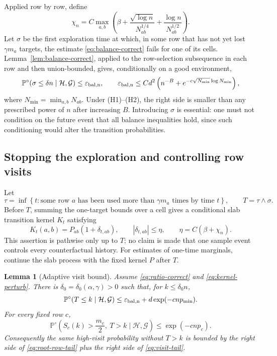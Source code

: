 \documentclass[11pt]{article}
\newcommand{\Pp}{\mathbb P}
\newcommand{\1}{\mathbf 1}
\newcommand{\cH}{\mathcal H}
\newcommand{\cG}{\mathcal G}
\newtheorem{lemma}[theorem]{Lemma}
\theoremstyle{remark}
\begin{document}
Applied row by row, define
\begin{equation}\label{eq:chi}
 \chi_n=C\max_{a,b}\left(
  \beta+\frac{\sqrt{\log n}}{N_{ab}^{1/4}}
       +\frac{\log n}{N_{ab}^{1/2}}
 \right).
\end{equation}
Let $\sigma$ be the first exploration time at which, in some row that has
not yet lost $\gamma m_a$ targets, the estimate
\eqref{eq:balance-correct} fails for one of its cells.  Lemma~\ref{lem:balance-correct},
applied to the row-selection subsequence in each row and then union-bounded,
gives, conditionally on a good environment,
\begin{equation}\label{eq:balance-stop-tail}
 \Pp^\circ(\sigma\le \delta n\mid\cH,\cG)
 \le \varepsilon_{\rm bal,n},
 \qquad
 \varepsilon_{\rm bal,n}
 \le C d^2\left(n^{-B}+e^{-c\sqrt{N_{\min}}\log N_{\min}}\right),
\end{equation}
where $N_{\min}=\min_{a,b}N_{ab}$.  Under (H1)--(H2), the right side is
smaller than any prescribed power of $n$ after increasing $B$.  Introducing
$\sigma$ is essential: one must not condition on the future event that all
balance inequalities hold, since such conditioning would alter the
transition probabilities.

\subsection{Stopping the exploration and controlling row visits}

Let
\[
 \tau=\inf\left\{t:\text{some row $a$ has been used more than }
                         \gamma m_a\text{ times by time }t\right\},
 \qquad T=\tau\wedge\sigma.
\]
Before $T$, summing the one-target bounds over a cell gives a conditional slab
transition kernel $K_t$ satisfying
\begin{equation}\label{eq:kernel-perturb}
 K_t(a,b)=P_{ab}(1+\delta_{t,ab}),\qquad
 |\delta_{t,ab}|\le\eta,
 \qquad \eta=C(\beta+\chi_n).
\end{equation}
This assertion is pathwise only up to $T$; no claim is made that one sample
event controls every counterfactual history.  For estimates of one-time
marginals, continue the slab process with the fixed kernel $P$ after $T$.

\begin{lemma}[Adaptive visit bound]\label{lem:adaptive-visits}
Assume \eqref{eq:ratio-correct} and \eqref{eq:kernel-perturb}.  There is
$\delta_0=\delta_0(\alpha,\gamma)>0$ such that, for $k\le\delta_0 n$,
\begin{equation}\label{eq:visit-tail}
 \Pp^\circ(T\le k\mid\cH,\cG)
 \le \varepsilon_{\rm bal,n}+d\exp(-c n p_{\min}).
\end{equation}
For every fixed row $c$,
\begin{equation}\label{eq:root-row-tail}
 \Pp^\circ\left(S_c(k)>\frac{m_c}{2},\ T>k\mid\cH,\cG\right)
 \le \exp(-c n p_c).
\end{equation}
Consequently the same high-visit probability without $T>k$ is bounded by
the right side of \eqref{eq:root-row-tail} plus the right side of
\eqref{eq:visit-tail}.
\end{lemma}
\end{document}
